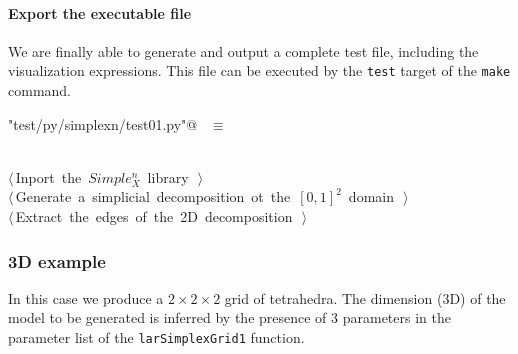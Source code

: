 \documentclass[11pt,oneside]{article}	%
\begin{document}
\paragraph{Export the executable file}
We are finally able to generate and output a complete test file, including the visualization expressions. This file can be executed by the \texttt{test} target of the \texttt{make} command.

\begin{flushleft} \small \label{scrap13}
\verb@"test/py/simplexn/test01.py"@\nobreak\ {\footnotesize {} }$\equiv$
\vspace{-1ex}
\begin{list}{}{} \item
\mbox{}\verb@@\\
\mbox{}\verb@@\hbox{$\langle\,$Inport the $Simple_X^n$ library\nobreak\ {\footnotesize {}}$\,\rangle$}\verb@@\\
\mbox{}\verb@@\hbox{$\langle\,$Generate a simplicial decomposition ot the $[0,1]^2$ domain\nobreak\ {\footnotesize {}}$\,\rangle$}\verb@@\\
\mbox{}\verb@@\hbox{$\langle\,$Extract the edges of the 2D decomposition\nobreak\ {\footnotesize {}}$\,\rangle$}\verb@@\\
\mbox{}\verb@@{\NWsep}
\end{list}
\vspace{-2ex}
\end{flushleft}

\subsubsection{3D example}

In this case we produce a $2\times 2\times 2$ grid of tetrahedra. The dimension (3D) of the model to be generated is inferred by the presence of 3 parameters in the parameter list of the \texttt{larSimplexGrid1} function. 
\end{document}
